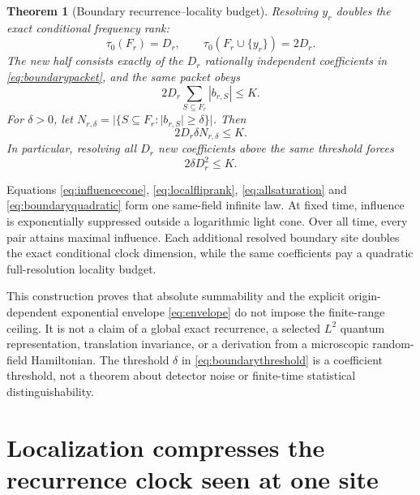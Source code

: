 \documentclass[10pt]{article}
\newtheorem{theorem}{Theorem}
\theoremstyle{definition}
\begin{document}
\begin{theorem}[Boundary recurrence--locality budget]
Resolving \(y_r\) doubles the exact conditional frequency rank:
\begin{equation}
 \boxed{\tau_0(F_r)=D_r,\qquad
 \tau_0(F_r\cup\{y_r\})=2D_r.}
 \label{eq:boundarydoubling}
\end{equation}
The new half consists exactly of the \(D_r\) rationally independent
coefficients in \eqref{eq:boundarypacket}, and the same packet obeys
\begin{equation}
 \boxed{
 2D_r\sum_{S\subseteq F_r}|b_{r,S}|\le K.}
 \label{eq:boundarymass}
\end{equation}
For \(\delta>0\), let
\(N_{r,\delta}=|\{S\subseteq F_r:|b_{r,S}|\ge\delta\}|\). Then
\begin{equation}
 \boxed{
 2D_r\delta N_{r,\delta}\le K.}
 \label{eq:boundarythreshold}
\end{equation}
In particular, resolving all \(D_r\) new coefficients above the same
threshold forces
\begin{equation}
 \boxed{2\delta D_r^2\le K.}
 \label{eq:boundaryquadratic}
\end{equation}
\end{theorem}

Equations \eqref{eq:influencecone}, \eqref{eq:localfliprank},
\eqref{eq:allsaturation} and \eqref{eq:boundaryquadratic} form one
same-field infinite law. At fixed time, influence is exponentially
suppressed outside a logarithmic light cone. Over all time, every pair
attains maximal influence. Each additional resolved boundary site doubles
the exact conditional clock dimension, while the same coefficients pay a
quadratic full-resolution locality budget.

This construction proves that absolute summability and the explicit
origin-dependent exponential envelope \eqref{eq:envelope} do not impose
the finite-range ceiling. It is not a claim of a global exact recurrence,
a selected \(L^2\) quantum representation, translation invariance, or a
derivation from a microscopic random-field Hamiltonian. The threshold
\(\delta\) in \eqref{eq:boundarythreshold} is a coefficient threshold, not
a theorem about detector noise or finite-time statistical
distinguishability.

\section{Localization compresses the recurrence clock seen at one site}
\end{document}
